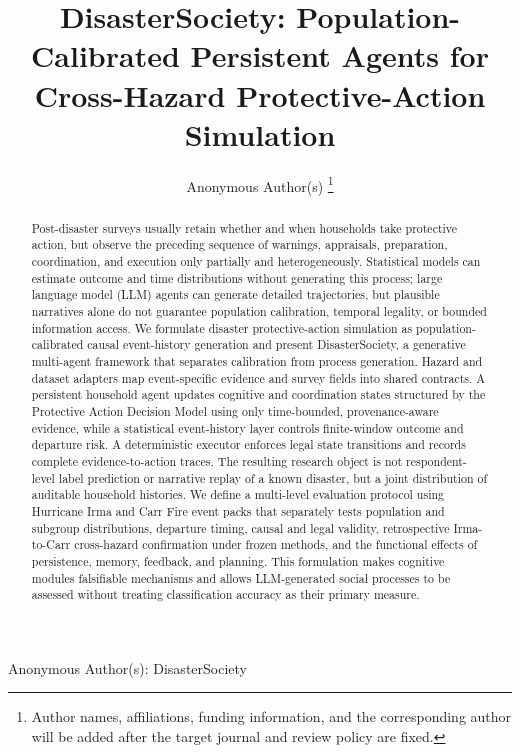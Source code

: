 \documentclass[journal]{IEEEtran}
\newcommand{\method}{DisasterSociety}
\begin{document}
\title{DisasterSociety: Population-Calibrated Persistent Agents for
Cross-Hazard Protective-Action Simulation}

\author{Anonymous Author(s)%
\thanks{Author names, affiliations, funding information, and the corresponding
author will be added after the target journal and review policy are fixed.}}

%
{Anonymous Author(s): DisasterSociety}

\maketitle

\begin{abstract}
Post-disaster surveys usually retain whether and when households take
protective action, but observe the preceding sequence of warnings, appraisals,
preparation, coordination, and execution only partially and heterogeneously.
Statistical models can estimate outcome and time distributions without
generating this process; large language model (LLM) agents can generate
detailed trajectories, but plausible narratives alone do not guarantee
population calibration, temporal legality, or bounded information access. We
formulate disaster
protective-action simulation as population-calibrated causal event-history
generation and present \method, a generative multi-agent framework that
separates calibration from process generation. Hazard and dataset adapters
map event-specific evidence and survey fields into shared contracts. A
persistent household agent updates cognitive and coordination states
structured by the Protective Action Decision Model using only time-bounded,
provenance-aware evidence, while a statistical event-history layer controls
finite-window outcome and departure risk. A deterministic executor enforces
legal state transitions and
records complete evidence-to-action traces. The resulting research object is
not respondent-level label prediction or narrative replay of a known disaster,
but a joint distribution of auditable household histories. We define a
multi-level evaluation protocol using Hurricane Irma and Carr Fire event packs
that separately tests population and subgroup distributions, departure timing,
causal and legal validity, retrospective Irma-to-Carr cross-hazard
confirmation under frozen methods, and the functional effects of persistence,
memory, feedback, and planning. This formulation makes cognitive modules
falsifiable mechanisms and allows LLM-generated social processes to be
assessed without treating classification accuracy as their primary measure.
\end{abstract}
\end{document}
